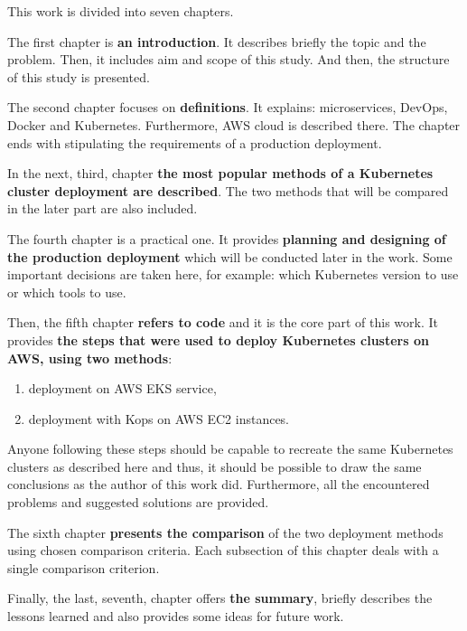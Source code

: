 This work is divided into seven chapters.

The first chapter is \textbf{an introduction}. It describes briefly the topic and the problem. Then, it includes aim and scope of this study. And then, the structure of this study is presented.

The second chapter focuses on \textbf{definitions}. It explains: microservices, DevOps, Docker and Kubernetes. Furthermore, AWS cloud is described there. The chapter ends with stipulating the requirements of a production deployment.

In the next, third, chapter \textbf{the most popular methods of a Kubernetes cluster deployment are described}. The two methods that will be compared in the later part are also included.

The fourth chapter is a practical one. It provides \textbf{planning and designing of the production deployment} which will be conducted later in the work. Some important decisions are taken here, for example: which Kubernetes version to use or which tools to use.

Then, the fifth chapter \textbf{refers to code} and it is the core part of this work. It provides \textbf{the steps that were used to deploy Kubernetes clusters on AWS, using two methods}:
\begin{enumerate}
\item deployment on AWS EKS service,
\item deployment with Kops on AWS EC2 instances.
\end{enumerate}
Anyone following these steps should be capable to recreate the same Kubernetes clusters as described here and thus, it should be possible to draw the same conclusions as the author of this work did. Furthermore, all the encountered problems and suggested solutions are provided.

The sixth chapter \textbf{presents the comparison} of the two deployment methods using chosen comparison criteria. Each subsection of this chapter deals with a single comparison criterion.

Finally, the last, seventh, chapter offers \textbf{the summary}, briefly describes the lessons learned and also provides some ideas for future work.
